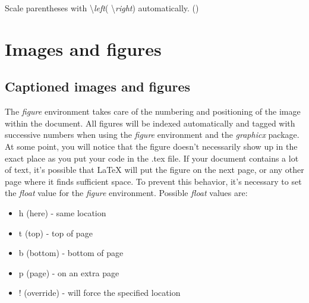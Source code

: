 \documentclass[11pt]{article}  %
\begin{document}
      Scale parentheses with \textbackslash \textit{left}( \textbackslash \textit{right}) automatically. \left(\right)


  \section{Images and figures}

    \subsection{Captioned images and figures}
      The \textit{figure} environment takes care of the numbering and positioning of the image within the document. All figures will be indexed automatically and tagged with successive numbers when using the \textit{figure} environment and the \textit{graphicx} package.\\

      At some point, you will notice that the figure doesn't necessarily show up in the exact place as you put your code in the .tex file. If your document contains a lot of text, it's possible that LaTeX will put the figure on the next page, or any other page where it finds sufficient space. To prevent this behavior, it's necessary to set the \textit{float} value for the \textit{figure} environment. Possible \textit{float} values are:

      \begin{itemize}
      	\item h (here) - same location
      	\item t (top) - top of page
      	\item b (bottom) - bottom of page
        \item p (page) - on an extra page
        \item ! (override) - will force the specified location
      \end{itemize}
\end{document}
